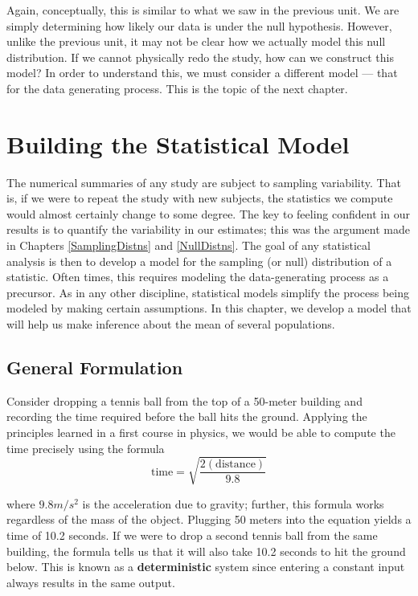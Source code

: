\documentclass[]{book}
\theoremstyle{definition}
\theoremstyle{definition}
\theoremstyle{definition}
\theoremstyle{remark}
\begin{document}
Again, conceptually, this is similar to what we saw in the previous
unit. We are simply determining how likely our data is under the null
hypothesis. However, unlike the previous unit, it may not be clear how
we actually model this null distribution. If we cannot physically redo
the study, how can we construct this model? In order to understand this,
we must consider a different model --- that for the data generating
process. This is the topic of the next chapter.

\chapter{Building the Statistical Model}\label{ANOVAmodel}

The numerical summaries of any study are subject to sampling
variability. That is, if we were to repeat the study with new subjects,
the statistics we compute would almost certainly change to some degree.
The key to feeling confident in our results is to quantify the
variability in our estimates; this was the argument made in Chapters
\ref{SamplingDistns} and \ref{NullDistns}. The goal of any statistical
analysis is then to develop a model for the sampling (or null)
distribution of a statistic. Often times, this requires modeling the
data-generating process as a precursor. As in any other discipline,
statistical models simplify the process being modeled by making certain
assumptions. In this chapter, we develop a model that will help us make
inference about the mean of several populations.

\section{General Formulation}\label{general-formulation}

Consider dropping a tennis ball from the top of a 50-meter building and
recording the time required before the ball hits the ground. Applying
the principles learned in a first course in physics, we would be able to
compute the time precisely using the formula
\[\text{time} = \sqrt{\frac{2(\text{distance})}{9.8}}\]

where \(9.8 m/s^2\) is the acceleration due to gravity; further, this
formula works regardless of the mass of the object. Plugging 50 meters
into the equation yields a time of 10.2 seconds. If we were to drop a
second tennis ball from the same building, the formula tells us that it
will also take 10.2 seconds to hit the ground below. This is known as a
\textbf{deterministic} system since entering a constant input always
results in the same output.
\end{document}
